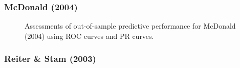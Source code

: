 \clearpage
\subsubsection*{McDonald (2004)}



\FloatBarrier

\begin{figure}
	\centering   
	\caption{Assessments of out-of-sample predictive performance for McDonald (2004) using ROC curves and PR curves.}
\end{figure}
\FloatBarrier

\clearpage
\subsubsection*{Reiter \& Stam (2003)}



\FloatBarrier

